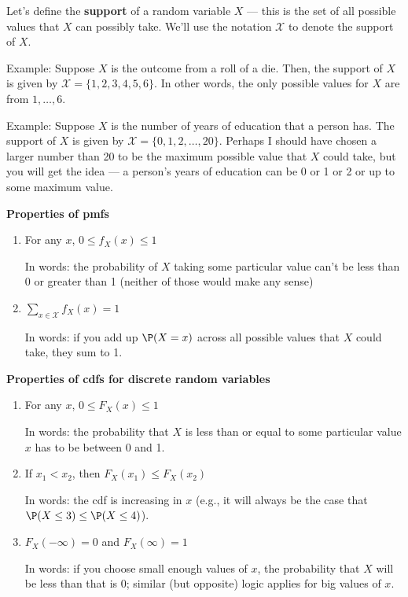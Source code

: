 \documentclass[
  letterpaper,
  DIV=11,
  numbers=noendperiod]{scrreprt}
\begin{document}
Let's define the \textbf{support} of a random variable \(X\) --- this is
the set of all possible values that \(X\) can possibly take. We'll use
the notation \(\mathcal{X}\) to denote the support of \(X\).

{Example: }Suppose \(X\) is the outcome from a roll of a die. Then, the
support of \(X\) is given by \(\mathcal{X} = \{1,2,3,4,5,6\}\). In other
words, the only possible values for \(X\) are from \(1,\ldots,6\).

{Example: }Suppose \(X\) is the number of years of education that a
person has. The support of \(X\) is given by
\(\mathcal{X} = \{0, 1, 2, \ldots, 20\}\). Perhaps I should have chosen
a larger number than 20 to be the maximum possible value that \(X\)
could take, but you will get the idea --- a person's years of education
can be 0 or 1 or 2 or up to some maximum value.

\textbf{Properties of pmfs}

\begin{enumerate}
\def\labelenumi{\arabic{enumi}.}
\item
  For any \(x\), \(0 \leq f_X(x) \leq 1\)

  In words: the probability of \(X\) taking some particular value can't
  be less than 0 or greater than 1 (neither of those would make any
  sense)
\item
  \(\sum_{x \in \mathcal{X}} f_X(x) = 1\)

  In words: if you add up \(\P(X=x)\) across all possible values that
  \(X\) could take, they sum to 1.
\end{enumerate}

\textbf{Properties of cdfs for discrete random variables}

\begin{enumerate}
\def\labelenumi{\arabic{enumi}.}
\item
  For any \(x\), \(0 \leq F_X(x) \leq 1\)

  In words: the probability that \(X\) is less than or equal to some
  particular value \(x\) has to be between 0 and 1.
\item
  If \(x_1 < x_2\), then \(F_X(x_1) \leq F_X(x_2)\)

  In words: the cdf is increasing in \(x\) (e.g., it will always be the
  case that \(\P(X \leq 3) \leq \P(X \leq 4)\)).
\item
  \(F_X(-\infty)=0\) and \(F_X(\infty)=1\)

  In words: if you choose small enough values of \(x\), the probability
  that \(X\) will be less than that is 0; similar (but opposite) logic
  applies for big values of \(x\).
\end{enumerate}
\end{document}
